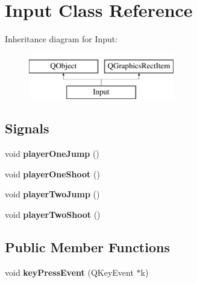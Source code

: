 \hypertarget{class_input}{}\section{Input Class Reference}
\label{class_input}
Inheritance diagram for Input\+:\begin{figure}[H]
\begin{center}
\leavevmode
\includegraphics[height=2.000000cm]{class_input}
\end{center}
\end{figure}
\subsection*{Signals}
\begin{DoxyCompactItemize}
\item 
void {\bfseries player\+One\+Jump} ()\hypertarget{class_input_a3c56e6c2e6960014a56835cab6298d20}{}\label{class_input_a3c56e6c2e6960014a56835cab6298d20}

\item 
void {\bfseries player\+One\+Shoot} ()\hypertarget{class_input_a90a64a89b4d9804ed16c6141e9946a58}{}\label{class_input_a90a64a89b4d9804ed16c6141e9946a58}

\item 
void {\bfseries player\+Two\+Jump} ()\hypertarget{class_input_ad7689c70cb0680ed838db073af088c0a}{}\label{class_input_ad7689c70cb0680ed838db073af088c0a}

\item 
void {\bfseries player\+Two\+Shoot} ()\hypertarget{class_input_af8eba659f268b7cb19558c5a2bd40d17}{}\label{class_input_af8eba659f268b7cb19558c5a2bd40d17}

\end{DoxyCompactItemize}
\subsection*{Public Member Functions}
\begin{DoxyCompactItemize}
\item 
void {\bfseries key\+Press\+Event} (Q\+Key\+Event $\ast$k)\hypertarget{class_input_af33a8e4ba483419bd40b1c20ccc1cd7f}{}\label{class_input_af33a8e4ba483419bd40b1c20ccc1cd7f}

\end{DoxyCompactItemize}
